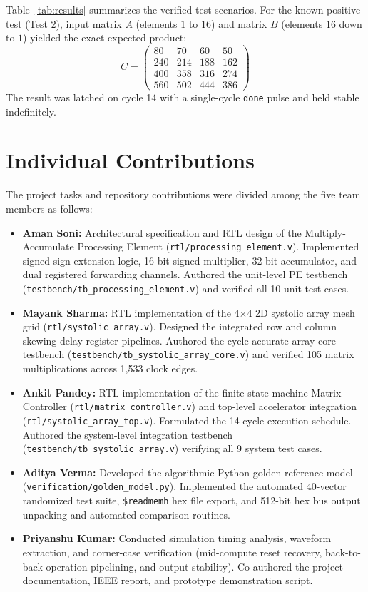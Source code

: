 \documentclass[conference]{IEEEtran}
\begin{document}
Table~\ref{tab:results} summarizes the verified test scenarios. For the known positive test (Test 2), input matrix $A$ (elements $1$ to $16$) and matrix $B$ (elements $16$ down to $1$) yielded the exact expected product:
\begin{equation}
C = \begin{pmatrix} 80 & 70 & 60 & 50 \\ 240 & 214 & 188 & 162 \\ 400 & 358 & 316 & 274 \\ 560 & 502 & 444 & 386 \end{pmatrix}
\end{equation}
The result was latched on cycle 14 with a single-cycle \texttt{done} pulse and held stable indefinitely.

\section{Individual Contributions}
The project tasks and repository contributions were divided among the five team members as follows:

\begin{itemize}
    \item \textbf{Aman Soni:} Architectural specification and RTL design of the Multiply-Accumulate Processing Element (\texttt{rtl/processing\_element.v}). Implemented signed sign-extension logic, 16-bit signed multiplier, 32-bit accumulator, and dual registered forwarding channels. Authored the unit-level PE testbench (\texttt{testbench/tb\_processing\_element.v}) and verified all 10 unit test cases.
    \item \textbf{Mayank Sharma:} RTL implementation of the 4$\times$4 2D systolic array mesh grid (\texttt{rtl/systolic\_array.v}). Designed the integrated row and column skewing delay register pipelines. Authored the cycle-accurate array core testbench (\texttt{testbench/tb\_systolic\_array\_core.v}) and verified 105 matrix multiplications across 1,533 clock edges.
    \item \textbf{Ankit Pandey:} RTL implementation of the finite state machine Matrix Controller (\texttt{rtl/matrix\_controller.v}) and top-level accelerator integration (\texttt{rtl/systolic\_array\_top.v}). Formulated the 14-cycle execution schedule. Authored the system-level integration testbench (\texttt{testbench/tb\_systolic\_array.v}) verifying all 9 system test cases.
    \item \textbf{Aditya Verma:} Developed the algorithmic Python golden reference model (\texttt{verification/golden\_model.py}). Implemented the automated 40-vector randomized test suite, \texttt{\$readmemh} hex file export, and 512-bit hex bus output unpacking and automated comparison routines.
    \item \textbf{Priyanshu Kumar:} Conducted simulation timing analysis, waveform extraction, and corner-case verification (mid-compute reset recovery, back-to-back operation pipelining, and output stability). Co-authored the project documentation, IEEE report, and prototype demonstration script.
\end{itemize}
\end{document}
